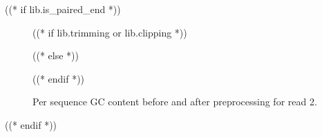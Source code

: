 ((* if lib.is_paired_end *))
    \begin{figure}[h!]
        \centering
        ((* if lib.trimming or lib.clipping *))
        \begin{minipage}[b]{0.48\textwidth}
            \centering
        \end{minipage}
        \begin{minipage}[b]{0.48\textwidth}
            \centering
        \end{minipage}
        ((* else *))
        \begin{minipage}[b]{0.48\textwidth}
            \centering
        \end{minipage}
        ((* endif *))
        \caption{Per sequence GC content before and after preprocessing for read 2.}
    \end{figure}
((* endif *))


